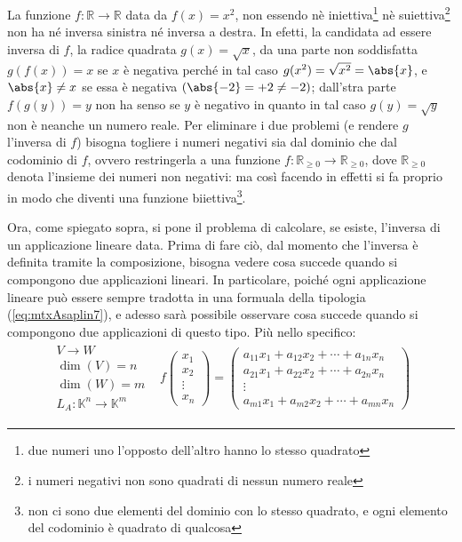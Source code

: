 \begin{es}
  \label{es:Compinveeproddimatrici1}
  La funzione $f:\mathds{R}\to \mathds{R}$ data da $f(x)=x^2$, non essendo nè iniettiva\footnote{due numeri uno
    l'opposto dell'altro hanno lo stesso quadrato} nè suiettiva\footnote{i numeri negativi non sono quadrati di nessun
    numero reale} non ha né inversa sinistra né inversa a destra. In efetti, la candidata ad essere inversa di $f$,
  la radice quadrata $g(x)=\sqrt{x}$, da una parte non soddisfatta $g(f(x))=x$ se $x$ è negativa perché in tal caso
  $g(x^2)=\sqrt{x^2}=\abs{x}$, e $\abs{x}\neq x$ se essa è negativa $(\abs{-2}=+2\neq -2)$; dall'stra parte $f(g(y))=y$
  non ha senso se $y$ è negativo in quanto in tal caso $g(y)=\sqrt{y}$ non è neanche un numero reale. Per eliminare i
  due problemi (e rendere $g$ l'inversa di $f$) bisogna togliere i numeri negativi sia dal dominio che dal codominio di
  $f$, ovvero restringerla a una funzione $f:\mathds{R}_{\geq 0}\to \mathds{R}_{\geq0}$, dove $\mathds{R}_{\geq 0}$ denota
  l'insieme dei numeri non negativi: ma così facendo in effetti si fa proprio in modo che diventi una funzione
  biiettiva\footnote{non ci sono due elementi del dominio con lo stesso quadrato, e ogni elemento del codominio è
    quadrato di qualcosa}.
\end{es}
Ora, come spiegato sopra, si pone il problema di calcolare, se esiste, l'inversa di un applicazione lineare data. Prima
di fare ciò, dal momento che l'inversa è definita tramite la composizione, bisogna vedere cosa succede quando si compongono
due applicazioni lineari. In particolare, poiché ogni applicazione lineare può essere sempre tradotta in una formuala della
tipologia (\ref{eq:mtxAsaplin7}), e adesso sarà possibile osservare cosa succede quando si compongono due applicazioni di
questo tipo. Più nello specifico:
\begin{eqnarray}
  \label{eq:Compinveeproddimatrici1}
  \begin{matrix}
    V\to W\\
    \dim(V)=n\\
    \dim(W)=m\\
    L_A:\mathds{K}^n\to\mathds{K}^m
  \end{matrix} & f
                 \begin{pmatrix}
                   x_1\\
                   x_2\\
                   \vdots\\
                   x_n
                 \end{pmatrix}=
                 \begin{pmatrix}
                   a_{11}x_1+a_{12}x_2+\cdots+a_{1n}x_n\\
                   a_{21}x_1+a_{22}x_2+\cdots+a_{2n}x_n\\
                   \vdots\\
                   a_{m1}x_1+a_{m2}x_2+\cdots+a_{mn}x_n
                 \end{pmatrix}
\end{eqnarray}
